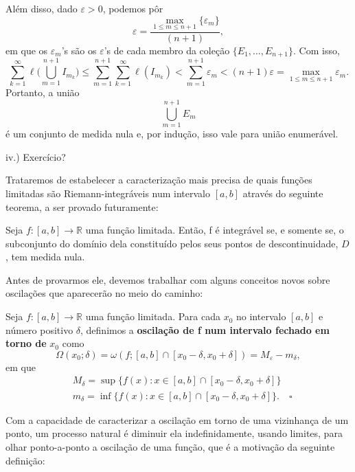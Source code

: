 \documentclass[../analysisII_notes.tex]{subfiles}
\begin{document}
\begin{proof*}
\[	\]
	Além disso, dado \(\varepsilon > 0\), podemos pôr
	\[
		\varepsilon = \frac{\max_{1\leq m\leq n+1}\{\varepsilon_{m}\}}{(n+1)},
	\]
	em que os \(\varepsilon_{m}\)'s são os \(\varepsilon\)'s de cada membro da coleção \(\{E_1, \dotsc , E_{n+1}\}.\) Com isso,
	\[
		\sum\limits_{k=1}^{\infty}\ell \biggl(\bigcup_{m=1}^{n+1}I_{m_{k}}\biggr) \leq \sum\limits_{m=1}^{n+1}\sum\limits_{k=1}^{\infty}\ell (I_{m_{k}}) < \sum\limits_{m=1}^{n+1}\varepsilon_{m} < (n+1)\varepsilon = \max_{1\leq m\leq n+1}\varepsilon_{m}.
	\]
	Portanto, a união
	\[
		\bigcup_{m=1}^{n+1}E_{m}
	\]
	é um conjunto de medida nula e, por indução, isso vale para união enumerável.

	iv.) Exercício? \qedsymbol
\end{proof*}

Trataremos de estabelecer a caracterização mais precisa de quais funções limitadas são Riemann-integráveis num intervalo \([a, b]\) através do seguinte teorema, a ser provado futuramente:
\hypertarget{lebesgue_theorem}{
	\begin{theorem*}
		Seja \(f:[a, b]\rightarrow \mathbb{R}\) uma função limitada. Então, f é integrável se, e somente se, o subconjunto do domínio dela constituído pelos seus pontos de descontinuidade, \(D\), tem medida nula.
	\end{theorem*}
}
Antes de provarmos ele, devemos trabalhar com alguns conceitos novos sobre oscilações que aparecerão no meio do caminho:

\begin{def*}
	Seja \(f:[a, b]\rightarrow \mathbb{R}\) uma função limitada. Para cada \(x_{0}\) no intervalo \([a, b]\) e número positivo \(\delta \), definimos a \textbf{oscilação de f num intervalo fechado em torno de }\(x_{0}\) como
	\[
		\Omega (x_{0}; \delta )=\omega(f; [a, b]\cap [x_{0}-\delta , x_{0}+\delta ]) = M_{\varepsilon }-m_{\delta },
	\]
	em que
	\begin{align*}
		 & M_{\delta }=\sup_{}\{f(x):x\in [a, b]\cap [x_{0}-\delta , x_{0}+\delta ]\}               \\
		 & m_{\delta }=\inf_{}\{f(x):x\in [a, b]\cap [x_{0}-\delta , x_{0}+\delta ]\}.\quad \square
	\end{align*}
\end{def*}
Com a capacidade de caracterizar a oscilação em torno de uma vizinhança de um ponto, um processo natural é diminuir ela indefinidamente, usando limites, para olhar ponto-a-ponto a oscilação de uma função, que é a motivação da seguinte definição:
\end{document}
